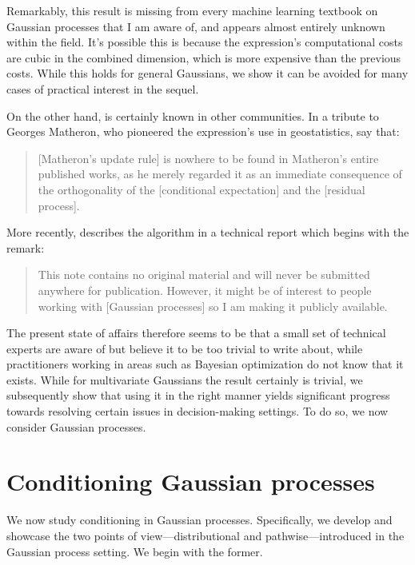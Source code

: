 \documentclass[11pt]{book}
\begin{document}
Remarkably, this result is missing from every machine learning textbook on Gaussian processes that I am aware of, and appears almost entirely unknown within the field.
It's possible this is because the expression's computational costs are cubic in the combined dimension, which is more expensive than the previous costs.
While this holds for general Gaussians, we show it can be avoided for many cases of practical interest in the sequel.

On the other hand,  is certainly known in other communities.
In a tribute to Georges Matheron, who pioneered the expression's use in geostatistics, \textcite{chiles05} say that:

\begin{quotation}
[Matheron's update rule] is nowhere to be found in Matheron's entire published works, as he merely regarded it as an immediate consequence of the orthogonality of the [conditional expectation] and the [residual process].
\end{quotation}

More recently, \textcite{doucet10} describes the algorithm in a technical report which begins with the remark: 

\begin{quotation}
This note contains no original material and will never be submitted anywhere for publication. However, it might be of interest to people working with [Gaussian processes] so I am making it publicly available.
\end{quotation}

The present state of affairs therefore seems to be that a small set of technical experts are aware of  but believe it to be too trivial to write about, while practitioners working in areas such as Bayesian optimization do not know that it exists.
While for multivariate Gaussians the result certainly is trivial, we subsequently show that using it in the right manner yields significant progress towards resolving certain issues in decision-making settings.
To do so, we now consider Gaussian processes.

\section{Conditioning Gaussian processes}

We now study conditioning in Gaussian processes.
Specifically, we develop and showcase the two points of view---distributional and pathwise---introduced in the Gaussian process setting.
We begin with the former.
\end{document}
